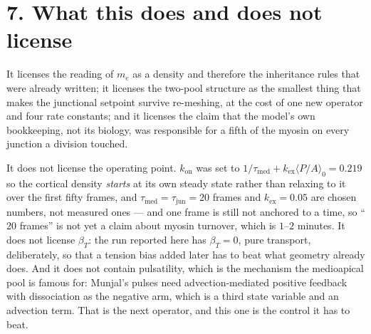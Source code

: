 \documentclass[10pt,a4paper]{article}
\begin{document}
\section*{7.\; What this does and does not license}

It licenses the reading of $m_e$ as a density and therefore the inheritance rules that were already
written; it licenses the two-pool structure as the smallest thing that makes the junctional setpoint
survive re-meshing, at the cost of one new operator and four rate constants; and it licenses the
claim that the model's own bookkeeping, not its biology, was responsible for a fifth of the myosin on
every junction a division touched.

It does not license the operating point. $k_{\text{on}}$ was set to
$1/\tau_{\text{med}}+k_{\text{ex}}\langle P/A\rangle_0 = 0.219$ so the cortical density \emph{starts}
at its own steady state rather than relaxing to it over the first fifty frames, and
$\tau_{\text{med}}=\tau_{\text{jun}}=20$ frames and $k_{\text{ex}}=0.05$ are chosen numbers, not
measured ones --- and one frame is still not anchored to a time, so ``$20$ frames'' is not yet a claim
about myosin turnover, which is $1$--$2$ minutes. It does not license $\beta_T$: the run reported here
has $\beta_T=0$, pure transport, deliberately, so that a tension bias added later has to beat what
geometry already does. And it does not contain pulsatility, which is the mechanism the medioapical
pool is famous for: Munjal's pulses need advection-mediated positive feedback with dissociation as the
negative arm, which is a third state variable and an advection term. That is the next operator, and
this one is the control it has to beat.
\end{document}
